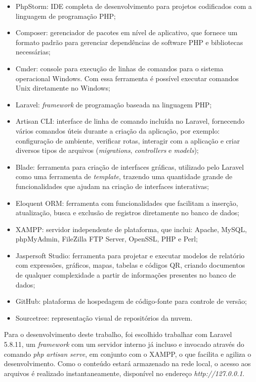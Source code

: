 \begin{itemize}
    \item PhpStorm: IDE completa de desenvolvimento para projetos codificados com a linguagem de programação PHP;
    \item Composer: gerenciador de pacotes em nível de aplicativo, que fornece um formato padrão para gerenciar dependências de software PHP e bibliotecas necessárias;
    \item Cmder: console para execução de linhas de comandos para o sistema operacional Windows. Com essa ferramenta é possível executar comandos Unix diretamente no Windows;
    \item Laravel: \textit{framework} de programação baseada na linguagem PHP;
    \item Artisan CLI: interface de linha de comando incluída no Laravel, fornecendo vários comandos úteis durante a criação da aplicação, por exemplo: configuração de ambiente, verificar rotas, interagir com a aplicação e criar diversos tipos de arquivos (\textit{migrations}, \textit{controllers} e \textit{models});
    \item Blade: ferramenta para criação de interfaces gráficas, utilizado pelo Laravel como uma ferramenta de \textit{template}, trazendo uma quantidade grande de funcionalidades que ajudam na criação de interfaces interativas;
    \item Eloquent ORM: ferramenta com funcionalidades que facilitam a inserção, atualização, busca e exclusão de registros diretamente no banco de dados;
    \item XAMPP: servidor independente de plataforma, que inclui: Apache, MySQL, phpMyAdmin, FileZilla FTP Server, OpenSSL, PHP e Perl;
    \item Jaspersoft Studio: ferramenta para projetar e executar modelos de relatório com expressões, gráficos, mapas, tabelas e códigos QR, criando documentos de qualquer complexidade a partir de informações presentes no banco de dados;
    \item GitHub: plataforma de hospedagem de código-fonte para controle de versão;
    \item Sourcetree: representação visual de repositórios da nuvem.
\end{itemize}

\newpage
Para o desenvolvimento deste trabalho, foi escolhido trabalhar com Laravel 5.8.11, um \textit{framework} com um servidor interno já incluso e invocado através do comando \textit{php artisan serve}, em conjunto com o XAMPP, o que facilita e agiliza o desenvolvimento. Como o conteúdo estará armazenado na rede local, o acesso aos arquivos é realizado instantaneamente, disponível no endereço \textit{http://127.0.0.1}.

